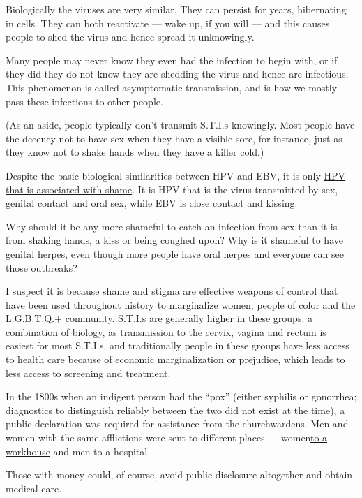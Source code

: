 Biologically the viruses are very similar. They can persist for years,
hibernating in cells. They can both reactivate --- wake up, if you will
--- and this causes people to shed the virus and hence spread it
unknowingly.

Many people may never know they even had the infection to begin with, or
if they did they do not know they are shedding the virus and hence are
infectious. This phenomenon is called asymptomatic transmission, and is
how we mostly pass these infections to other people.

(As an aside, people typically don't transmit S.T.I.s knowingly. Most
people have the decency not to have sex when they have a visible sore,
for instance, just as they know not to shake hands when they have a
killer cold.)

Despite the basic biological similarities between HPV and EBV, it is
only \href{https://www.ncbi.nlm.nih.gov/pmc/articles/PMC5763398/}{HPV
that is associated with shame}. It is HPV that is the virus transmitted
by sex, genital contact and oral sex, while EBV is close contact and
kissing.

Why should it be any more shameful to catch an infection from sex than
it is from shaking hands, a kiss or being coughed upon? Why is it
shameful to have genital herpes, even though more people have oral
herpes and everyone can see those outbreaks?

I suspect it is because shame and stigma are effective weapons of
control that have been used throughout history to marginalize women,
people of color and the L.G.B.T.Q.+ community. S.T.I.s are generally
higher in these groups: a combination of biology, as transmission to the
cervix, vagina and rectum is easiest for most S.T.I.s, and traditionally
people in these groups have less access to health care because of
economic marginalization or prejudice, which leads to less access to
screening and treatment.

In the 1800s when an indigent person had the ``pox'' (either syphilis or
gonorrhea; diagnostics to distinguish reliably between the two did not
exist at the time), a public declaration was required for assistance
from the churchwardens. Men and women with the same afflictions were
sent to different places ---
women\href{https://journalofethics.ama-assn.org/article/hivaids-stigma-historical-perspectives-sexually-transmitted-diseases/2005-10}{to
a workhouse} and men to a hospital.

Those with money could, of course, avoid public disclosure altogether
and obtain medical care.


